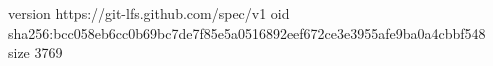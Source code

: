 version https://git-lfs.github.com/spec/v1
oid sha256:bcc058eb6cc0b69bc7de7f85e5a0516892eef672ce3e3955afe9ba0a4cbbf548
size 3769
